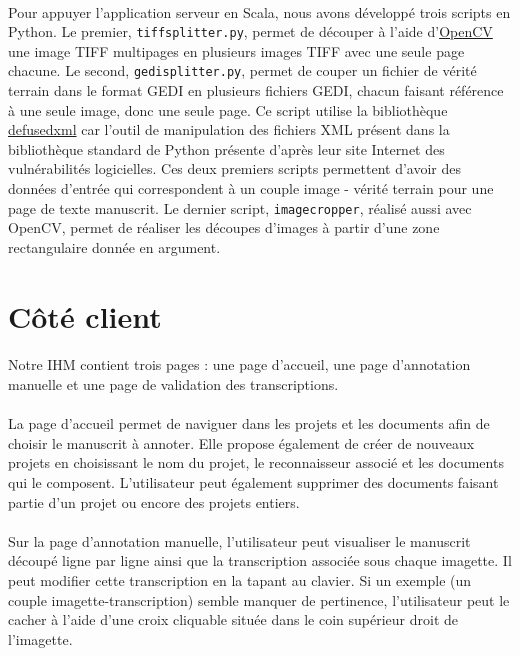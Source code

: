 \paragraph{}
Pour appuyer l'application serveur en Scala, nous avons développé trois scripts en Python. Le premier, \texttt{tiffsplitter.py}, permet de découper à l'aide d'\href{https://opencv.org/}{OpenCV} une image TIFF multipages en plusieurs images TIFF avec une seule page chacune. Le second, \texttt{gedisplitter.py}, permet de couper un fichier de vérité terrain dans le format GEDI en plusieurs fichiers GEDI, chacun faisant référence à une seule image, donc une seule page. Ce script utilise la bibliothèque \href{https://pypi.org/project/defusedxml/}{defusedxml} car l'outil de manipulation des fichiers XML présent dans la bibliothèque standard de Python présente d'après leur site Internet des vulnérabilités logicielles. Ces deux premiers scripts permettent d'avoir des données d'entrée qui correspondent à un couple image - vérité terrain pour une page de texte manuscrit. Le dernier script, \texttt{imagecropper}, réalisé aussi avec OpenCV, permet de réaliser les découpes d'images à partir d'une zone rectangulaire donnée en argument.

\section{Côté client}
\paragraph{}
Notre IHM contient trois pages : une page d'accueil, une page d'annotation manuelle et une page de validation des transcriptions.
\paragraph{}
La page d'accueil permet de naviguer dans les projets et les documents afin de choisir le manuscrit à annoter. Elle propose également de créer de nouveaux projets en choisissant le nom du projet, le reconnaisseur associé et les documents qui le composent. L'utilisateur peut également supprimer des documents faisant partie d'un projet ou encore des projets entiers.
\paragraph{}
Sur la page d'annotation manuelle, l'utilisateur peut visualiser le manuscrit découpé ligne par ligne ainsi que la transcription associée sous chaque imagette. Il peut modifier cette transcription en la tapant au clavier. Si un exemple (un couple imagette-transcription) semble manquer de pertinence, l'utilisateur peut le cacher à l'aide d'une croix cliquable située dans le coin supérieur droit de l'imagette.
